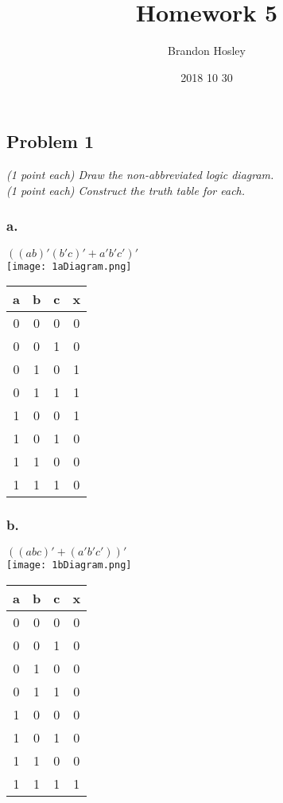 \documentclass[a4paper,man,natbib]{apa6}
\title{Homework 5}
\author{Brandon Hosley}
\date{2018 10 30}
\affiliation{Mike Davis}
\begin{document}
\maketitle
\raggedbottom

\subsection{Problem 1}
\emph{(1 point each) Draw the non-abbreviated logic diagram. \\
	(1 point each) Construct the truth table for each.}
\subsubsection{a.}
\emph{$ ( (𝑎𝑏)′ (𝑏′𝑐)′ + 𝑎′𝑏′𝑐′ )′ $} \\
\texttt{[image: 1aDiagram.png]}
\begin{tabular}{c c c | c}
	a & b & c & x \\
	\hline
	0 & 0 & 0 & 0 \\
	0 & 0 & 1 & 0 \\
	0 & 1 & 0 & 1 \\
	0 & 1 & 1 & 1 \\
	1 & 0 & 0 & 1 \\
	1 & 0 & 1 & 0 \\
	1 & 1 & 0 & 0 \\
	1 & 1 & 1 & 0 \\
\end{tabular}

\subsubsection{b.}
\emph{$  ( (𝑎𝑏𝑐)′ + (𝑎′𝑏′𝑐′) )′ $} \\
\texttt{[image: 1bDiagram.png]}
\begin{tabular}{c c c | c}
	a & b & c & x \\
	\hline
	0 & 0 & 0 & 0 \\
	0 & 0 & 1 & 0 \\
	0 & 1 & 0 & 0 \\
	0 & 1 & 1 & 0 \\
	1 & 0 & 0 & 0 \\
	1 & 0 & 1 & 0 \\
	1 & 1 & 0 & 0 \\
	1 & 1 & 1 & 1 \\
\end{tabular}

\clearpage
\end{document}
